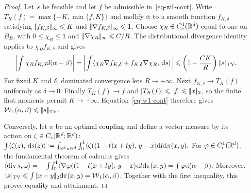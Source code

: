 \begin{proof}
Let $s$ be feasible and let $f$ be admissible in~\eqref{eq-w1-cont}. Write $T_K(f)=\max\{-K,\min\{f,K\}\}$ and mollify it to a smooth function $f_{K,\delta}$ satisfying $|\!| f_{K,\delta} |\!|_\infty\leqslant K$ and $|\!| \nabla f_{K,\delta} |\!|_\infty\leqslant1$. Choose $\chi_R\in C_c^1(\mathbb{R}^d)$ equal to one on $B_R$, with $0\leq\chi_R\leq1$ and $|\!| \nabla\chi_R |\!|_\infty\leqslant C/R$. The distributional divergence identity applies to $\chi_R f_{K,\delta}$ and gives
\[
\left|\int \chi_R f_{K,\delta}\mathrm{d}(\alpha-\beta)\right|
=
\left|\int\langle \chi_R\nabla f_{K,\delta}+f_{K,\delta}\nabla\chi_R,\,\mathrm{d}s\rangle\right|
\leqslant
\left(1+\frac{CK}{R}\right)|\!| s |\!|_{\operatorname{TV}}.
\]
For fixed $K$ and $\delta$, dominated convergence lets $R\to+\infty$. Next $f_{K,\delta}\to T_K(f)$ uniformly as $\delta\to0$. Finally $T_K(f)\to f$ and $|T_K(f)|\leqslant|f|\leqslant|\!| x |\!|_2$, so the finite first moments permit $K\to+\infty$. Equation~\eqref{eq-w1-cont} therefore gives $\operatorname{\mathcal{W}}_1(\alpha,\beta)\leqslant|\!| s |\!|_{\operatorname{TV}}$.

Conversely, let $\pi$ be an optimal coupling and define a vector measure by its action on $\zeta\in C_c(\mathbb{R}^d;\mathbb{R}^d)$:
\(\int\langle \zeta(z),\,\mathrm{d}s(z)\rangle \coloneqq \int_{\mathbb{R}^d\times\mathbb{R}^d}\int_0^1 \langle \zeta((1-t)x+ty),\,y-x\rangle\mathrm{d} t\mathrm{d}\pi(x,y).\)
For $\varphi\in C_c^1(\mathbb{R}^d)$, the fundamental theorem of calculus gives \(\langle\operatorname{div}s,\varphi\rangle = -\int\!\int_0^1 \langle \nabla\varphi((1-t)x+ty),\,y-x\rangle\mathrm{d} t\mathrm{d}\pi(x,y) = \int\varphi\mathrm{d}(\alpha-\beta).\)
Moreover, $|\!| s |\!|_{\operatorname{TV}}\leqslant\int|\!| x-y |\!|_2\mathrm{d}\pi(x,y)=\operatorname{\mathcal{W}}_1(\alpha,\beta)$. Together with the first inequality, this proves equality and attainment.
\end{proof}
